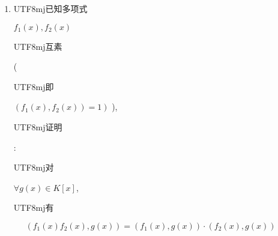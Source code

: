 \documentclass[10pt]{article}
\begin{document}
\begin{enumerate}
  \item \begin{CJK}{UTF8}{mj}已知多项式\end{CJK} $f_{1}(x), f_{2}(x)$ \begin{CJK}{UTF8}{mj}互素\end{CJK} (\begin{CJK}{UTF8}{mj}即\end{CJK} $\left.\left(f_{1}(x), f_{2}(x)\right)=1\right)$ ), \begin{CJK}{UTF8}{mj}证明\end{CJK}: \begin{CJK}{UTF8}{mj}对\end{CJK} $\forall g(x) \in K[x]$, \begin{CJK}{UTF8}{mj}有\end{CJK}

\end{enumerate}
$$
\left(f_{1}(x) f_{2}(x), g(x)\right)=\left(f_{1}(x), g(x)\right) \cdot\left(f_{2}(x), g(x)\right)
$$
\end{document}
